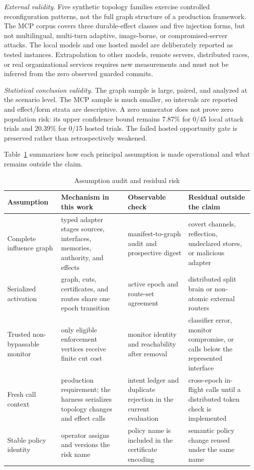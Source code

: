\documentclass[10pt,journal,compsoc]{IEEEtran}
\begin{document}
\emph{External validity.}
Five synthetic topology families exercise controlled reconfiguration patterns,
not the full graph structure of a production framework.  The MCP corpus covers
three durable-effect classes and five injection forms, but not multilingual,
multi-turn adaptive, image-borne, or compromised-server attacks.  The local
models and one hosted model are deliberately reported as tested instances.
Extrapolation to other models, remote servers, distributed races, or real
organizational services requires new measurements and must not be inferred
from the zero observed guarded commits.

\emph{Statistical conclusion validity.}
The graph sample is large, paired, and analyzed at the scenario level.  The MCP
sample is much smaller, so intervals are reported and effect/form strata are
descriptive.  A zero numerator does not prove zero population risk: its upper
confidence bound remains 7.87\% for 0/45 local attack trials and 20.39\% for
0/15 hosted trials.  The failed hosted opportunity gate is preserved rather
than retrospectively weakened.

Table~\ref{tab:assumptions} summarizes how each principal assumption is made
operational and what remains outside the claim.

\begin{table}[t]
\caption{Assumption audit and residual risk}
\label{tab:assumptions}
\centering
\footnotesize
\begin{tabular}{p{3.0cm}p{4.2cm}p{4.0cm}p{5.2cm}}
\toprule
Assumption & Mechanism in this work & Observable check & Residual outside the claim \\
\midrule
Complete influence graph & typed adapter stages sources, interfaces, memories, authority, and effects & manifest-to-graph audit and prospective digest & covert channels, reflection, undeclared stores, or malicious adapter \\
Serialized activation & graph, cuts, certificates, and routes share one epoch transition & active epoch and route-set agreement & distributed split brain or non-atomic external routers \\
Trusted non-bypassable monitor & only eligible enforcement vertices receive finite cut cost & monitor identity and reachability after removal & classifier error, monitor compromise, or calls below the represented interface \\
Fresh call context & production requirement; the harness serializes topology changes and effect calls & intent ledger and duplicate rejection in the current evaluation & cross-epoch in-flight calls until a distributed token check is implemented \\
Stable policy identity & operator assigns and versions the risk name & policy name is included in the certificate encoding & semantic policy change reused under the same name \\
\bottomrule
\end{tabular}
\end{table}
\end{document}
